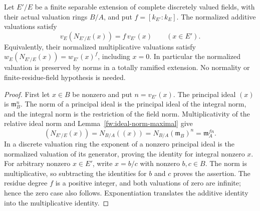 \begin{lemma}
\label{fw:norm-valuation}
\leanok
Let $E'/E$ be a finite separable extension of complete discretely
valued fields, with their actual valuation rings $B/A$, and put
$f=[k_{E'}:k_E]$. The normalized additive valuations satisfy
\[
 v_E(N_{E'/E}(x))=f\,v_{E'}(x)\qquad(x\in E').
\]
Equivalently, their normalized multiplicative valuations satisfy
$w_E(N_{E'/E}(x))=w_{E'}(x)^f$, including $x=0$.
In particular the normalized valuation is preserved by norms in a
totally ramified extension. No normality or finite-residue-field
hypothesis is needed.
\end{lemma}
\begin{proof}
First let $x\in B$ be nonzero and put $n=v_{E'}(x)$. The principal
ideal $(x)$ is $\mathfrak m_B^n$. The norm of a principal ideal is
the principal ideal of the integral norm, and the integral norm is
the restriction of the field norm. Multiplicativity of the relative
ideal norm and Lemma~\ref{fw:ideal-norm-maximal} give
\[
 (N_{E'/E}(x))
 =N_{B/A}((x))
 =N_{B/A}(\mathfrak m_B)^n
 =\mathfrak m_A^{fn}.
\]
In a discrete valuation ring the exponent of a nonzero principal ideal
is the normalized valuation of its generator, proving the identity
for integral nonzero $x$. For arbitrary nonzero $x\in E'$, write
$x=b/c$ with nonzero $b,c\in B$. The norm is multiplicative, so
subtracting the identities for $b$ and $c$ proves the assertion.
The residue degree $f$ is a positive integer, and both valuations of
zero are infinite; hence the zero case also follows. Exponentiation
translates the additive identity into the multiplicative identity.
\end{proof}

